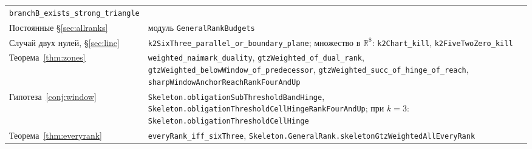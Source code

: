 \documentclass[11pt,a4paper]{article}
\theoremstyle{plain}
\theoremstyle{definition}
\theoremstyle{remark}
\newcommand{\RR}{\mathbb{R}}
\newcommand{\code}[1]{\texttt{\small #1}}
\begin{document}
\begin{longtable}{@{}>{\raggedright\arraybackslash}p{}>{\raggedright\arraybackslash}p{}@{}}
  \code{branchB\_exists\_strong\_triangle}\\
Постоянные \S\ref{sec:allranks} & модуль \code{GeneralRankBudgets}\\
Случай двух нулей, \S\ref{sec:line} & \code{k2SixThree\_parallel\_or\_boundary\_plane};
  множество в $\RR^8$: \code{k2Chart\_kill}, \code{k2FiveTwoZero\_kill}\\
Теорема~\ref{thm:zones} & \code{weighted\_naimark\_duality},
  \code{gtzWeighted\_of\_dual\_rank},
  \code{gtzWeighted\_belowWindow\_of\_predecessor},
  \code{gtzWeighted\_succ\_of\_hinge\_of\_reach},
  \code{sharpWindowAnchorReachRankFourAndUp}\\
Гипотеза~\ref{conj:window} & \code{Skeleton.obligationSubThresholdBandHinge},
  \code{Skeleton.obligationThresholdCellHingeRankFourAndUp};
  при $k=3$: \code{Skeleton.obligationThresholdCellHinge}\\
Теорема~\ref{thm:everyrank} & \code{everyRank\_iff\_sixThree},
  \code{Skeleton.GeneralRank.skeletonGtzWeightedAllEveryRank}\\
\end{longtable}
\end{document}
